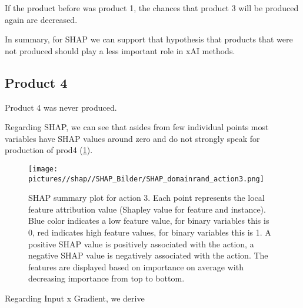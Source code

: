 If the product before was product 1, the chances that product 3 will be produced again are decreased.

In summary, for SHAP we can support that hypothesis that products that were not produced should play a less important role in xAI methods.

\subsection{Product 4}

Product 4 was never produced.

Regarding SHAP, we can see that asides from few individual points most variables have SHAP values around zero and do not strongly speak for production of prod4 (\ref{fig:SHAP_Action3}).

\begin{figure}[H]
    \centering
    \texttt{[image: pictures//shap//SHAP\_Bilder/SHAP\_domainrand\_action3.png]}
    \caption{SHAP summary plot for action 3.
        Each point represents the local feature attribution value (Shapley value for feature and instance).
        Blue color indicates a low feature value, for binary variables this is 0, red indicates high feature values, for binary variables this is 1. A positive SHAP value is positively associated with the action, a negative SHAP value is negatively associated with the action. The features are displayed based on importance on average with decreasing importance from top to bottom.}
    \label{fig:SHAP_Action3}
\end{figure}

Regarding Input x Gradient, we derive


